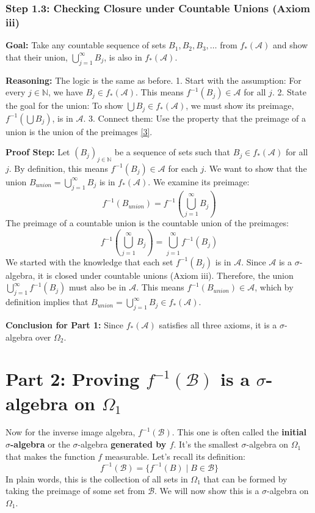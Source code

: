 \documentclass[11pt,a4paper]{article}
\begin{document}
\subsubsection*{Step 1.3: Checking Closure under Countable Unions (Axiom iii)}
\textbf{Goal:} Take any countable sequence of sets \(B_1, B_2, B_3, \dots\) from \(f_*(\mathcal{A})\) and show that their union, \(\bigcup_{j=1}^{\infty} B_j\), is also in \(f_*(\mathcal{A})\).

\textbf{Reasoning:} The logic is the same as before.
1. Start with the assumption: For every \(j \in \mathbb{N}\), we have \(B_j \in f_*(\mathcal{A})\). This means \(f^{-1}(B_j) \in \mathcal{A}\) for all \(j\).
2. State the goal for the union: To show \(\bigcup B_j \in f_*(\mathcal{A})\), we must show its preimage, \(f^{-1}(\bigcup B_j)\), is in \(\mathcal{A}\).
3. Connect them: Use the property that the preimage of a union is the union of the preimages \hyperlink{def:set-properties}{[3]}.

\textbf{Proof Step:}
Let \((B_j)_{j \in \mathbb{N}}\) be a sequence of sets such that \(B_j \in f_*(\mathcal{A})\) for all \(j\). By definition, this means \(f^{-1}(B_j) \in \mathcal{A}\) for each \(j\).
We want to show that the union \(B_{union} = \bigcup_{j=1}^{\infty} B_j\) is in \(f_*(\mathcal{A})\). We examine its preimage:
\[ f^{-1}(B_{union}) = f^{-1}\left(\bigcup_{j=1}^{\infty} B_j\right) \]
The preimage of a countable union is the countable union of the preimages:
\[ f^{-1}\left(\bigcup_{j=1}^{\infty} B_j\right) = \bigcup_{j=1}^{\infty} f^{-1}(B_j) \]
We started with the knowledge that each set \(f^{-1}(B_j)\) is in \(\mathcal{A}\). Since \(\mathcal{A}\) is a \(\sigma\)-algebra, it is closed under countable unions (Axiom iii). Therefore, the union \(\bigcup_{j=1}^{\infty} f^{-1}(B_j)\) must also be in \(\mathcal{A}\).
This means \(f^{-1}(B_{union}) \in \mathcal{A}\), which by definition implies that \(B_{union} = \bigcup_{j=1}^{\infty} B_j \in f_*(\mathcal{A})\).

\textbf{Conclusion for Part 1:} Since \(f_*(\mathcal{A})\) satisfies all three axioms, it is a \(\sigma\)-algebra over \(\Omega_2\). \qedsymbol

\newpage
\section{Part 2: Proving \(f^{-1}(\mathcal{B})\) is a \(\sigma\)-algebra on \(\Omega_1\)}

Now for the inverse image algebra, \(f^{-1}(\mathcal{B})\). This one is often called the \textbf{initial \(\sigma\)-algebra} or the \(\sigma\)-algebra \textbf{generated by \(f\)}. It's the smallest \(\sigma\)-algebra on \(\Omega_1\) that makes the function \(f\) measurable.
Let's recall its definition:
\[ f^{-1}(\mathcal{B}) = \{f^{-1}(B) \mid B \in \mathcal{B}\} \]
In plain words, this is the collection of all sets in \(\Omega_1\) that can be formed by taking the preimage of some set from \(\mathcal{B}\). We will now show this is a \(\sigma\)-algebra on \(\Omega_1\).
\end{document}
